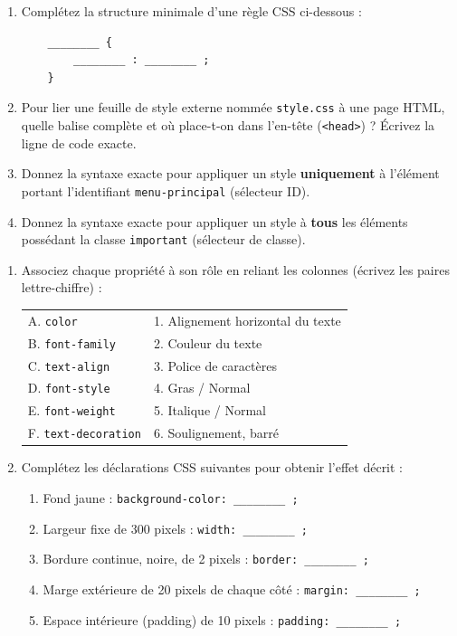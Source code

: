 \documentclass[11pt]{article}
\begin{document}
\begin{exercice}
\begin{enumerate}
    \item Complétez la structure minimale d'une règle CSS ci-dessous :
    \begin{verbatim}
    ________ {
        ________ : ________ ;
    }
    \end{verbatim}
    \item Pour lier une feuille de style externe nommée \texttt{style.css} à une page HTML, quelle balise complète et où place-t-on dans l'en-tête (\texttt{<head>}) ? Écrivez la ligne de code exacte.
    \item Donnez la syntaxe exacte pour appliquer un style \textbf{uniquement} à l'élément portant l'identifiant \texttt{menu-principal} (sélecteur ID).
    \item Donnez la syntaxe exacte pour appliquer un style à \textbf{tous} les éléments possédant la classe \texttt{important} (sélecteur de classe).
\end{enumerate}
\end{exercice}

\begin{exercice}
\begin{enumerate}
    \item Associez chaque propriété à son rôle en reliant les colonnes (écrivez les paires lettre-chiffre) :
    \begin{tabular}{ll}
        A. \texttt{color}              & 1. Alignement horizontal du texte \\
        B. \texttt{font-family}        & 2. Couleur du texte \\
        C. \texttt{text-align}         & 3. Police de caractères \\
        D. \texttt{font-style}         & 4. Gras / Normal \\
        E. \texttt{font-weight}        & 5. Italique / Normal \\
        F. \texttt{text-decoration}    & 6. Soulignement, barré \\
    \end{tabular}
    \item Complétez les déclarations CSS suivantes pour obtenir l'effet décrit :
    \begin{enumerate}
        \item Fond jaune : \texttt{background-color: \_\_\_\_\_\_\_\_ ;}
        \item Largeur fixe de 300 pixels : \texttt{width: \_\_\_\_\_\_\_\_ ;}
        \item Bordure continue, noire, de 2 pixels : \texttt{border: \_\_\_\_\_\_\_\_ ;}
        \item Marge extérieure de 20 pixels de chaque côté : \texttt{margin: \_\_\_\_\_\_\_\_ ;}
        \item Espace intérieure (padding) de 10 pixels : \texttt{padding: \_\_\_\_\_\_\_\_ ;}
    \end{enumerate}
\end{enumerate}
\end{exercice}
\end{document}
